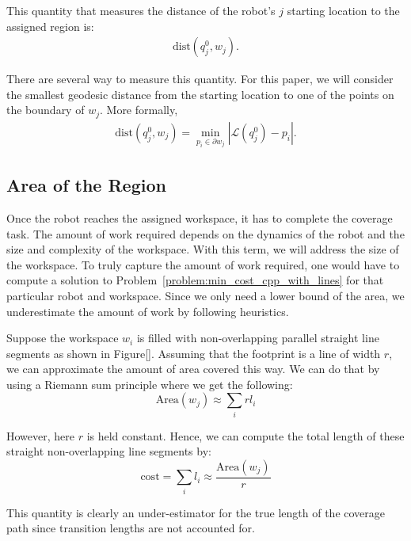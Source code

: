 \documentclass[../main.tex]{subfiles}
\begin{document}
This quantity that measures the distance of the robot's $j$ starting location to the assigned region is:
\begin{equation}
\begin{aligned}
	\text{dist}(q^0_j,w_j).
\end{aligned}
\end{equation}

There are several way to measure this quantity. For this paper, we will consider the smallest geodesic distance from the starting location to one of the points on the boundary of $w_j$. More formally,
\begin{equation}
\begin{aligned}
	\text{dist}(q^0_j,w_j)=\min_{p_i\in\partial w_j}|\mathcal{L}(q^0_j)-p_i|.
\end{aligned}
\end{equation}


\subsection{Area of the Region}

Once the robot reaches the assigned workspace, it has to complete the coverage task. The amount of work required depends on the dynamics of the robot and the size and complexity of the workspace. With this term, we will address the size of the workspace. To truly capture the amount of work required, one would have to compute a solution to Problem~\ref{problem:min_cost_cpp_with_lines} for that particular robot and workspace. Since we only need a lower bound of the area, we underestimate the amount of work by following heuristics. 

Suppose the workspace $w_i$ is filled with non-overlapping parallel straight line segments as shown in Figure[]. Assuming that the footprint is a line of width $r$, we can approximate the amount of area covered this way. We can do that by using a Riemann sum principle where we get the following:
\begin{equation}
	\text{Area}(w_j)\approx\sum_{i}rl_i
\end{equation}

However, here $r$ is held constant. Hence, we can compute the total length of these straight non-overlapping line segments by:
\begin{equation}
	\text{cost}=\sum_{i}l_i\approx\frac{\text{Area}(w_j)}{r}
\end{equation}

This quantity is clearly an under-estimator for the true length of the coverage path since transition lengths are not accounted for.
\end{document}
